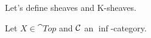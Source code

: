 \documentclass[../thesis.tex]{subfiles}
\begin{document}
    Let's define sheaves and K-sheaves.
    \begin{definition}\label{sheaf_on_top}
        Let $X \in \cat{Top}$ and $\mathcal{C}$ an $\inf$-category. 
    \end{definition}
\end{document}
